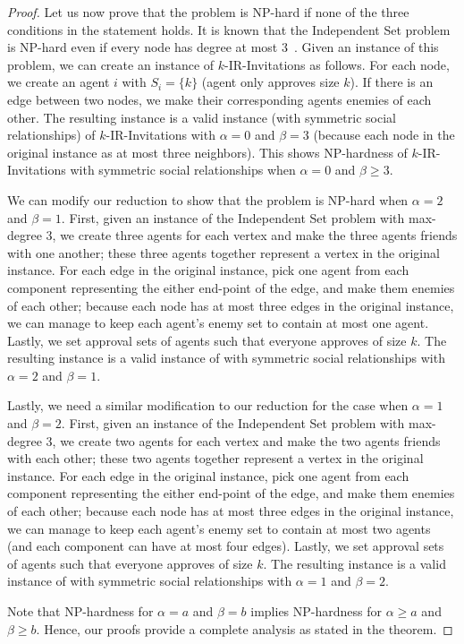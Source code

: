 \begin{proof}
		
	Let us now prove that the problem is NP-hard if none of the three conditions in the statement holds. 
	It is known that the Independent Set problem is NP-hard even if every node has degree at most 3~\cite{Garey_Max_Is_Cubic}. 
	Given an instance of this problem, we can create an instance of $k$-IR-Invitations as follows. 
	For each node, we create an agent $i$ with $S_i =\{k\}$ (agent only approves size $k$). 
	If there is an edge between two nodes, we make their corresponding agents enemies of each other. 
	The resulting instance is a valid instance (with symmetric social relationships) of $k$-IR-Invitations with $\alpha = 0$ and $\beta = 3$ (because each node in the original instance as at most three neighbors). 
	This shows NP-hardness of $k$-IR-Invitations with symmetric social relationships when $\alpha = 0$ and $\beta \geq 3$.	
	
	We can modify our reduction to show that the problem is NP-hard when $\alpha = 2$ and $\beta = 1$.
	First, given an instance of the Independent Set problem with max-degree 3, we create three agents for each vertex and make the three agents friends with one another; these three agents together represent a vertex in the original instance.
	For each edge in the original instance, pick one agent from each component representing the either end-point of the edge, and make them enemies of each other; because each node has at most three edges in the original instance, we can manage to keep each agent's enemy set to contain at most one agent. Lastly, we set approval sets of agents such that everyone approves of size $k$. The resulting instance is a valid instance of \SIPs with symmetric social relationships with $\alpha = 2$ and $\beta = 1$. 
	
	Lastly, we need a similar modification to our reduction for the case when $\alpha = 1$ and $\beta = 2$. 
	First, given an instance of the Independent Set problem with max-degree 3, we create two agents for each vertex and make the two agents friends with each other; these two agents together represent a vertex in the original instance.
	For each edge in the original instance, pick one agent from each component representing the either end-point of the edge, and make them enemies of each other; because each node has at most three edges in the original instance, we can manage to keep each agent's enemy set to contain at most two agents (and each component can have at most four edges). Lastly, we set approval sets of agents such that everyone approves of size $k$. The resulting instance is a valid instance of \SIPs with symmetric social relationships with $\alpha = 1$ and $\beta = 2$. 
 	
	Note that NP-hardness for $\alpha = a$ and $\beta = b$ implies NP-hardness for $\alpha \geq a$ and $\beta \geq b$.
	Hence, our proofs provide a complete analysis as stated in the theorem.
	
\end{proof}


